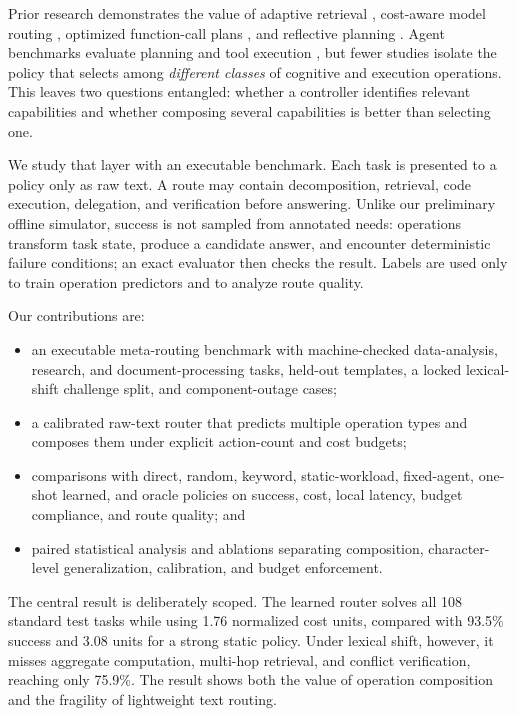 \documentclass[letterpaper]{article} %
\begin{document}
Prior research demonstrates the value of adaptive retrieval \citep{jeong2024adaptiverag}, cost-aware model routing \citep{chen2024frugalgpt,ong2025routellm}, optimized function-call plans \citep{kim2024llmcompiler}, and reflective planning \citep{yao2023react,zhang2026spiral}. Agent benchmarks evaluate planning and tool execution \citep{liu2024agentbench,yao2024taubench}, but fewer studies isolate the policy that selects among \emph{different classes} of cognitive and execution operations. This leaves two questions entangled: whether a controller identifies relevant capabilities and whether composing several capabilities is better than selecting one.

We study that layer with an executable benchmark. Each task is presented to a policy only as raw text. A route may contain decomposition, retrieval, code execution, delegation, and verification before answering. Unlike our preliminary offline simulator, success is not sampled from annotated needs: operations transform task state, produce a candidate answer, and encounter deterministic failure conditions; an exact evaluator then checks the result. Labels are used only to train operation predictors and to analyze route quality.

Our contributions are:

\begin{itemize}
    \item an executable meta-routing benchmark with machine-checked data-analysis, research, and document-processing tasks, held-out templates, a locked lexical-shift challenge split, and component-outage cases;
    \item a calibrated raw-text router that predicts multiple operation types and composes them under explicit action-count and cost budgets;
    \item comparisons with direct, random, keyword, static-workload, fixed-agent, one-shot learned, and oracle policies on success, cost, local latency, budget compliance, and route quality; and
    \item paired statistical analysis and ablations separating composition, character-level generalization, calibration, and budget enforcement.
\end{itemize}

The central result is deliberately scoped. The learned router solves all 108 standard test tasks while using 1.76 normalized cost units, compared with 93.5\% success and 3.08 units for a strong static policy. Under lexical shift, however, it misses aggregate computation, multi-hop retrieval, and conflict verification, reaching only 75.9\%. The result shows both the value of operation composition and the fragility of lightweight text routing.
\end{document}
